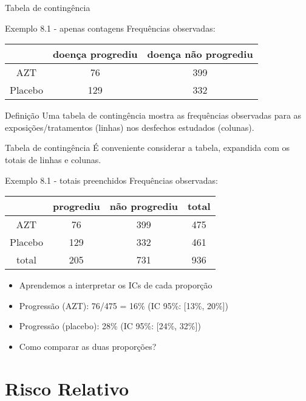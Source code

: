 \documentclass{beamer}
\begin{document}
\begin{frame}{Tabela de contingência}
  \begin{exampleblock}{Exemplo 8.1 - apenas contagens}
    Frequências observadas:
    \begin{tabular}{c|c|c}
      & doença progrediu & doença não progrediu\\
      \hline
      AZT & 76 & 399 \\
      \hline
      Placebo & 129 & 332 \\
    \end{tabular}
  \end{exampleblock}
  \begin{block}{Definição}
    Uma \alert{tabela de contingência} mostra as frequências
    observadas para as exposições/tratamentos (linhas) nos desfechos estudados (colunas).
  \end{block}
\end{frame}

\begin{frame}{Tabela de contingência}
  É conveniente considerar a tabela, expandida com os totais de linhas e colunas.
    \begin{exampleblock}{Exemplo 8.1 - totais preenchidos}
    Frequências observadas:
    \begin{tabular}{c|c|c|c}
      & progrediu & não progrediu & total\\
      \hline
      AZT & 76 & 399 & 475\\
      \hline
      Placebo & 129 & 332 & 461\\
      \hline
      total & 205 & 731 & 936\\
    \end{tabular}
  \end{exampleblock}
  \begin{itemize}
  \item Aprendemos a interpretar os ICs de cada proporção
  \item Progressão (AZT): 76/475 = 16\% (IC 95\%: [13\%, 20\%])
  \item Progressão (placebo): 28\% (IC 95\%: [24\%, 32\%])
  \item Como comparar as duas proporções?
  \end{itemize}
\end{frame}

\section{Risco Relativo}
\end{document}
